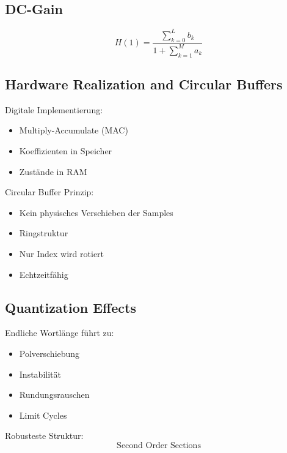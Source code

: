 \subsection{DC-Gain}

\[
H(1)=\frac{\sum_{k=0}^{L} b_k}
{1+\sum_{k=1}^{M} a_k}
\]

\subsection{Hardware Realization and Circular Buffers}

Digitale Implementierung:

\begin{itemize}
\item Multiply-Accumulate (MAC)
\item Koeffizienten in Speicher
\item Zustände in RAM
\end{itemize}

Circular Buffer Prinzip:

\begin{itemize}
\item Kein physisches Verschieben der Samples
\item Ringstruktur
\item Nur Index wird rotiert
\item Echtzeitfähig
\end{itemize}

\subsection{Quantization Effects}

Endliche Wortlänge führt zu:

\begin{itemize}
\item Polverschiebung
\item Instabilität
\item Rundungsrauschen
\item Limit Cycles
\end{itemize}

Robusteste Struktur:
\[
\text{Second Order Sections}
\]


